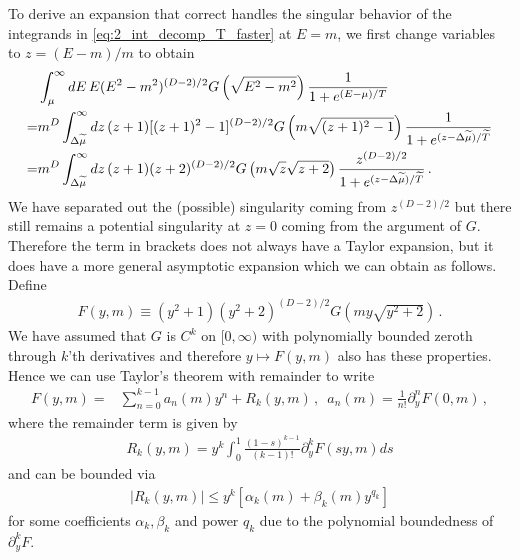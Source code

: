 \documentclass[sn-mathphys,Numbered]{sn-jnl}
\begin{document}
To derive an expansion that correct handles the singular behavior of the integrands in \eqref{eq:2_int_decomp_T_faster} at $E=m$, we first change variables to $z=(E-m)/m$  to obtain
\begin{align}
&\int_{\mu}^\infty dE\, E(E^2-m^2)^{(D-2)/2} G\left(\sqrt{E^2-m^2}\right)
    \frac{1}{1+e^{(E-\mu)/T}}\notag   \\
    =&m^{D}\int_{\Delta\widetilde{\mu}}^\infty dz\, (z+1)[(z+1)^2-1]^{(D-2)/2} G\left(m\sqrt{(z+1)^2-1}\right)
    \frac{1}{1+e^{(z-\Delta\widetilde{\mu})/\widetilde{T}}} \notag\\
        =&m^{D}\int_{\Delta\widetilde{\mu}}^\infty dz\, (z+1)(  z+2)^{(D-2)/2} G\left(m\sqrt{z}\sqrt{z+2}\right)
    \frac{z^{(D-2)/2}}{1+e^{(z-\Delta\widetilde{\mu})/\widetilde{T}}} \,.\label{eq:T_faster_int_1_change_vars}
\end{align}
We have separated out the (possible) singularity coming from $z^{(D-2)/2}$ but there still remains a potential singularity at $z=0$ coming from the argument of  $G$. Therefore the term in brackets does not always have a Taylor expansion, but it does have a more general asymptotic expansion which we can obtain as follows.  Define  
\begin{align}\label{eq:F_y_m_def}
  F(y,m)\equiv  (y^2+1)(  y^2+2)^{(D-2)/2} G\left(my\sqrt{y^2+2}\right)\,.
\end{align}
We have assumed that $G$ is $C^k$ on $[0,\infty)$ with polynomially bounded zeroth through $k$'th derivatives and therefore $y\mapsto F(y,m)$ also has these properties.   Hence we can use Taylor's theorem with remainder to write
\begin{align}\label{eq:F_y_m_Taylor}
F(y,m)=&\sum_{n=0}^{k-1} a_n(m)y^n +R_k(y,m)\,, \,\,\,a_n(m)=\frac{1}{n!}\partial_y^n F(0,m)\,,
\end{align}
where the remainder term is given by
\begin{align}
R_k(y,m)=y^k \int_0^1\frac{(1-s)^{k-1}}{(k-1)!}\partial_y^k F(sy,m)ds
\end{align}
and can be bounded via
\begin{align}\label{eq:R_k_poly_bound}
|R_k(y,m)|\leq y^k[\alpha_k(m)+\beta_k(m)y^{q_k}]
\end{align}
for some coefficients $\alpha_k,\beta_k$ and power $q_k$ due to the polynomial boundedness of $\partial_y^k F$.
\end{document}
